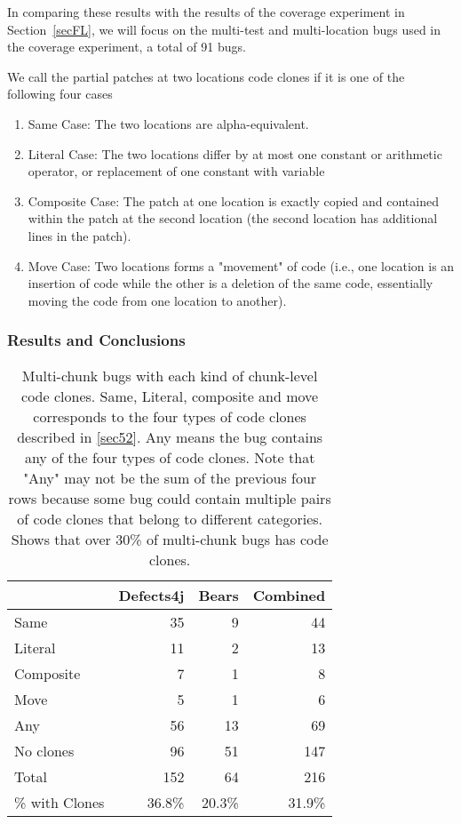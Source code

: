\documentclass[sigconf, timestamp-false, anonymous=true]{acmart}
\begin{document}
In comparing these results with the results of the coverage experiment in
Section~\ref{secFL}, we will focus on the multi-test and multi-location bugs used in the coverage 
experiment, a total of 91 bugs.

We call the partial patches at two locations code clones if it is one of the following four cases
\begin{enumerate}
	\item Same Case: The two locations are alpha-equivalent. 
	\item Literal Case: The two locations differ by at most one constant or arithmetic operator,
	or replacement of one constant with variable 
	\item Composite Case: The patch at one location is exactly copied and contained within the patch at 
	the 
	second location (the second location  has additional lines in the patch).
	\item Move Case: Two locations forms a "movement" of code (i.e., one location is an insertion of 
	code 
	while the other is a deletion of the same code, essentially moving the code from one location to 
	another).
\end{enumerate}

\subsubsection{Results and Conclusions}

\begin{table}
{\begin{center}
\begin{tabular} {| l | r | r | r |}
\hline
& Defects4j & Bears & Combined \\
\hline
Same & 35 & 9 & 44  \\ 
Literal & 11 & 2 & 13  \\
Composite & 7 & 1 & 8  \\
Move & 5 & 1 & 6  \\ \hline
Any & 56 & 13 & 69  \\ \hline
No clones & 96  &  51 & 147 \\ \hline
Total & 152 & 64 & 216 \\ \hline
\% with Clones & 36.8\% & 20.3\% & 31.9\% \\ \hline
\end{tabular}
\end{center}
}
\caption{Multi-chunk bugs with each kind of chunk-level code clones. Same, Literal, composite and 
move corresponds to
the four types of code clones described in \ref{sec52}. Any means the bug contains any of the four 
types of code clones. Note that "Any" may not
be the sum of the previous four rows because some bug could contain multiple pairs of code clones 
that
belong to different categories.
Shows that over 30\% of multi-chunk bugs has code clones.}
\label{tab:clones}
\end{table}
\end{document}
